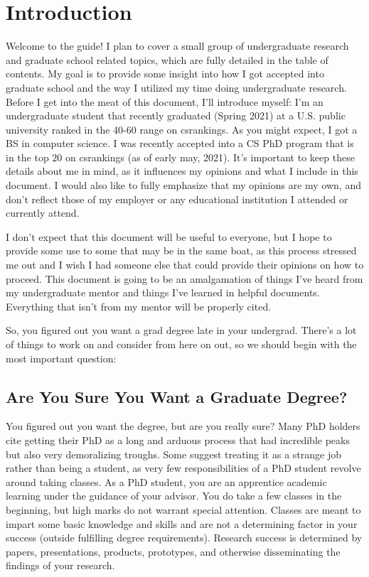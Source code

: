 \documentclass[12pt]{article}
\begin{document}


\section{Introduction}

Welcome to the guide! I plan to cover a small group of undergraduate research and graduate school related topics, which are fully detailed in the table of contents. My goal is to provide some insight into how I got accepted into graduate school and the way I utilized my time doing undergraduate research. Before I get into the meat of this document, I’ll introduce myself: I’m an undergraduate student that recently graduated (Spring 2021) at a U.S. public university ranked in the 40-60 range on csrankings. As you might expect, I got a BS in computer science. I was recently accepted into a CS PhD program that is in the top 20 on csrankings (as of early may, 2021). It’s important to keep these details about me in mind, as it influences my opinions and what I include in this document. I would also like to fully emphasize that my opinions are my own, and don’t reflect those of my employer or any educational institution I attended or currently attend. 

I don’t expect that this document will be useful to everyone, but I hope to provide some use to some that may be in the same boat, as this process stressed me out and I wish I had someone else that could provide their opinions on how to proceed. This document is going to be an amalgamation of things I've heard from my undergraduate mentor and things I've learned in helpful documents. Everything that isn't from my mentor will be properly cited.

So, you figured out you want a grad degree late in your undergrad. There’s a lot of things to work on and consider from here on out, so we should begin with the most important question:

\subsection{Are You Sure You Want a Graduate Degree?}

You figured out you want the degree, but are you really sure? Many PhD holders cite getting their PhD as a long and arduous process that had incredible peaks but also very demoralizing troughs. Some suggest treating it as a strange job rather than being a student, as very few responsibilities of a PhD student revolve around taking classes. \cite{AzumaPhD} As a PhD student, you are an apprentice academic learning under the guidance of your advisor. You do take a few classes in the beginning, but high marks do not warrant special attention. Classes are meant to impart some basic knowledge and skills and are not a determining factor in your success (outside fulfilling degree requirements). Research success is determined by papers, presentations, products, prototypes, and otherwise disseminating the findings of your research.
\end{document}
